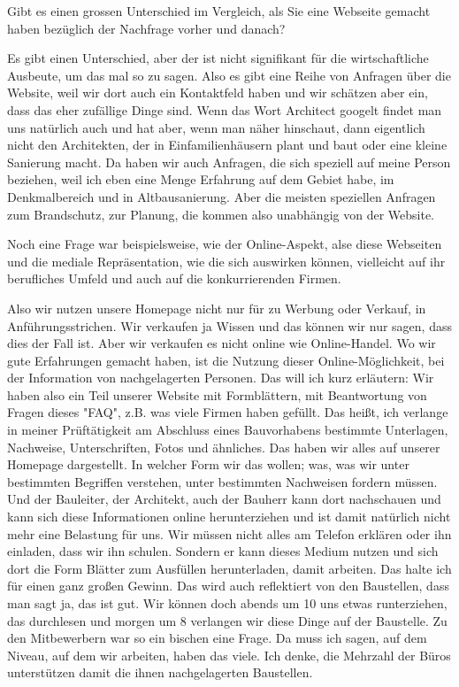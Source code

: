 \begin{description}
\Toni Gibt es einen grossen Unterschied im Vergleich, als Sie eine Webseite gemacht haben bezüglich der Nachfrage vorher und danach?

\Andre Es gibt einen Unterschied, aber der ist nicht signifikant für die wirtschaftliche Ausbeute, um das mal so zu sagen. Also es gibt eine Reihe von Anfragen über die Website, weil wir dort auch ein Kontaktfeld haben und wir schätzen aber ein, dass das eher zufällige Dinge sind. Wenn das Wort Architect googelt findet man uns natürlich auch und hat aber, wenn man näher hinschaut, dann eigentlich nicht den Architekten, der in Einfamilienhäusern plant und baut oder eine kleine Sanierung macht. Da haben wir auch Anfragen, die sich speziell auf meine Person beziehen, weil ich eben eine Menge Erfahrung auf dem Gebiet habe, im Denkmalbereich und in Altbausanierung. Aber die meisten speziellen Anfragen zum Brandschutz, zur Planung, die kommen also unabhängig von der Website.

\Toni Noch eine Frage war beispielsweise, wie der Online-Aspekt, alse diese Webseiten und die mediale Repräsentation, wie die sich auswirken können, vielleicht auf ihr berufliches Umfeld und auch auf die konkurrierenden Firmen.

\Andre Also wir nutzen unsere Homepage nicht nur für zu Werbung oder Verkauf, in Anführungsstrichen. Wir verkaufen ja Wissen und das können wir nur sagen, dass dies der Fall ist. Aber wir verkaufen es nicht online wie Online-Handel. Wo wir gute Erfahrungen gemacht haben, ist die Nutzung dieser Online-Möglichkeit, bei der Information von nachgelagerten Personen. Das will ich kurz erläutern: Wir haben also ein Teil unserer Website mit Formblättern, mit Beantwortung von Fragen dieses "FAQ", z.B. was viele Firmen haben gefüllt. Das heißt, ich verlange in meiner Prüftätigkeit am Abschluss eines Bauvorhabens bestimmte Unterlagen, Nachweise, Unterschriften, Fotos und ähnliches. Das haben wir alles auf unserer Homepage dargestellt. In welcher Form wir das wollen; was, was wir unter bestimmten Begriffen verstehen, unter bestimmten Nachweisen fordern müssen. Und der Bauleiter, der Architekt, auch der Bauherr kann dort nachschauen und kann sich diese Informationen online herunterziehen und ist damit natürlich nicht mehr eine Belastung für uns. Wir müssen nicht alles am Telefon erklären oder ihn einladen, dass wir ihn schulen. Sondern er kann dieses Medium nutzen und sich dort die Form Blätter zum Ausfüllen herunterladen, damit arbeiten. Das halte ich für einen ganz großen Gewinn. Das wird auch reflektiert von den Baustellen, dass man sagt ja, das ist gut. Wir können doch abends um 10 uns etwas runterziehen, das durchlesen und morgen um 8 verlangen wir diese Dinge auf der Baustelle. Zu den Mitbewerbern war so ein bischen eine Frage. Da muss ich sagen, auf dem Niveau, auf dem wir arbeiten, haben das viele. Ich denke, die Mehrzahl der Büros unterstützen damit die ihnen nachgelagerten Baustellen.


\end{description}

